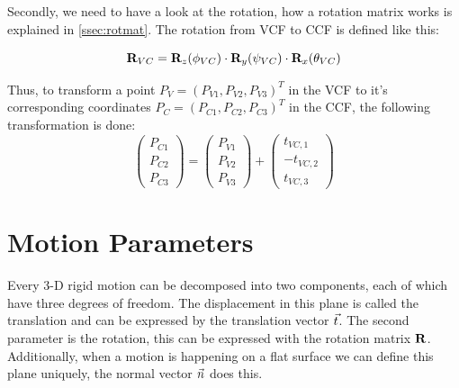 Secondly, we need to have a look at the rotation, how a rotation matrix works is explained in \autoref{ssec:rotmat}. The rotation from VCF to CCF is defined like this:

\begin{equation}
    \mathbf{R}_{VC} = \mathbf{R}_z(\phi_{VC})\cdot\mathbf{R}_y(\psi_{VC})\cdot\mathbf{R}_x(\theta_{VC})
\end{equation}

Thus, to transform a point $P_V = (P_{V1}, P_{V2}, P_{V3})^T$ in the VCF to it's corresponding coordinates $P_C = (P_{C1}, P_{C2}, P_{C3})^T$ in the CCF, the following transformation is done:
\begin{equation}
    \begin{pmatrix}
        P_{C1} \\ P_{C2}\\ P_{C3}
    \end{pmatrix} = \begin{pmatrix}
        P_{V1} \\ P_{V2}\\ P_{V3}
    \end{pmatrix} + \begin{pmatrix}
         t_{VC,1} \\ -t_{VC,2} \\ t_{VC,3}
     \end{pmatrix} 
\end{equation}

\section{Motion Parameters}
Every 3-D rigid motion can be decomposed into two components, each of which have three degrees of freedom. The displacement in this plane is called the translation and can be expressed by the translation vector $\vec t$. The second parameter is the rotation, this can be expressed with the rotation matrix $\mathbf{R}$. Additionally, when a motion is happening on a flat surface we can define this plane uniquely, the normal vector $\vec n$ does this.\bigskip

